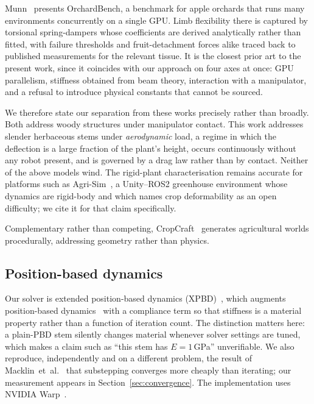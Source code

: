 \documentclass[conference]{IEEEtran}
\begin{document}
Munn~\cite{munn2026orchardbench} presents OrchardBench, a benchmark for apple
orchards that runs many environments concurrently on a single GPU. Limb
flexibility there is captured by torsional spring-dampers whose coefficients
are derived analytically rather than fitted, with failure thresholds and
fruit-detachment forces alike traced back to published measurements for the
relevant tissue. It is the closest prior art to the present work, since it
coincides with our approach on four axes at once: GPU parallelism, stiffness
obtained from beam theory, interaction with a manipulator, and a refusal to
introduce physical constants that cannot be sourced.

We therefore state our separation from these works precisely rather than
broadly. Both address woody structures under manipulator contact. This work
addresses slender herbaceous stems under \emph{aerodynamic} load, a regime in
which the deflection is a large fraction of the plant's height, occurs
continuously without any robot present, and is governed by a drag law rather
than by contact. Neither of the above models wind. The rigid-plant
characterisation remains accurate for platforms such as
Agri-Sim~\cite{agrisim2026}, a Unity--ROS2 greenhouse environment whose
dynamics are rigid-body and which names crop deformability as an open
difficulty; we cite it for that claim specifically.

Complementary rather than competing, CropCraft~\cite{cropcraft2025} generates
agricultural worlds procedurally, addressing geometry rather than physics.

\subsection{Position-based dynamics}

Our solver is extended position-based dynamics
(XPBD)~\cite{macklin2016xpbd}, which augments position-based
dynamics~\cite{muller2007pbd} with a compliance term so that stiffness is a
material property rather than a function of iteration count. The distinction
matters here: a plain-PBD stem silently changes material whenever solver
settings are tuned, which makes a claim such as ``this stem has $E=1$\,GPa''
unverifiable. We also reproduce, independently and on a different problem, the
result of Macklin~et~al.~\cite{macklin2019smallsteps} that substepping
converges more cheaply than iterating; our measurement appears in
Section~\ref{sec:convergence}. The implementation uses NVIDIA
Warp~\cite{warp2022}.
\end{document}
